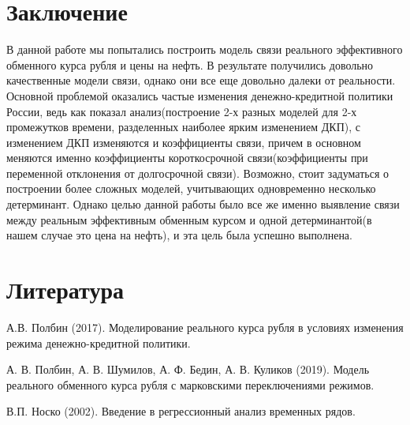 \documentclass{article}
\begin{document}
\section{Заключение}
В данной работе мы попытались построить модель связи реального эффективного обменного курса рубля и цены на нефть. В результате получились довольно качественные модели связи, однако они все еще довольно далеки от реальности. Основной проблемой оказались частые изменения денежно-кредитной политики России, ведь как показал анализ(построение 2-х разных моделей для 2-х промежутков времени, разделенных наиболее ярким изменением ДКП), с изменением ДКП изменяются и коэффициенты связи, причем в основном меняются именно коэффициенты короткосрочной связи(коэффициенты при переменной отклонения от долгосрочной связи). Возможно, стоит задуматься о построении более сложных моделей, учитывающих одновременно несколько детерминант. Однако целью данной работы было все же именно выявление связи между реальным эффективным обменным курсом и одной детерминантой(в нашем случае это цена на нефть), и эта цель была успешно выполнена.
\section{Литература}
А.В. Полбин (2017). Моделирование реального курса рубля в условиях изменения режима денежно-кредитной политики.

А. В. Полбин, А. В. Шумилов, А. Ф. Бедин, А. В. Куликов (2019). Модель реального обменного курса рубля с марковскими переключениями режимов.

В.П. Носко (2002). Введение в регрессионный анализ временных рядов.
\end{document}
